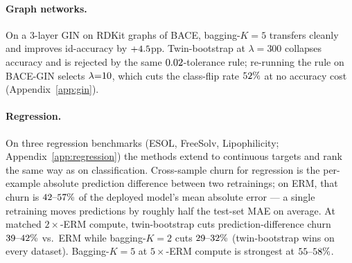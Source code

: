 \paragraph{Graph networks.}
On a $3$-layer GIN on RDKit graphs of BACE, bagging-$K{=}5$ transfers
cleanly and improves id-accuracy by $+4.5$pp.  Twin-bootstrap
at $\lambda{=}300$ collapses accuracy and is rejected by the same
$0.02$-tolerance rule; re-running the rule on BACE-GIN
selects $\lambda{=}10$, which cuts the class-flip rate
$52\%$ at no accuracy cost (Appendix~\ref{app:gin}).

\paragraph{Regression.}
On three regression benchmarks (ESOL, FreeSolv, Lipophilicity;
Appendix~\ref{app:regression}) the methods extend to continuous
targets and rank the same way as on classification.  Cross-sample
churn for regression is the per-example absolute prediction
difference between two retrainings; on ERM, that churn is
$42\text{--}57\%$ of the deployed
model's mean absolute error --- a single retraining moves predictions
by roughly half the test-set MAE on average.  At matched
$2\times$-ERM compute, twin-bootstrap cuts prediction-difference
churn $39\text{--}42\%$ vs.\ ERM while
bagging-$K{=}2$ cuts $29\text{--}32\%$
(twin-bootstrap wins on every dataset).  Bagging-$K{=}5$ at
$5\times$-ERM compute is strongest at
$55\text{--}58\%$.
